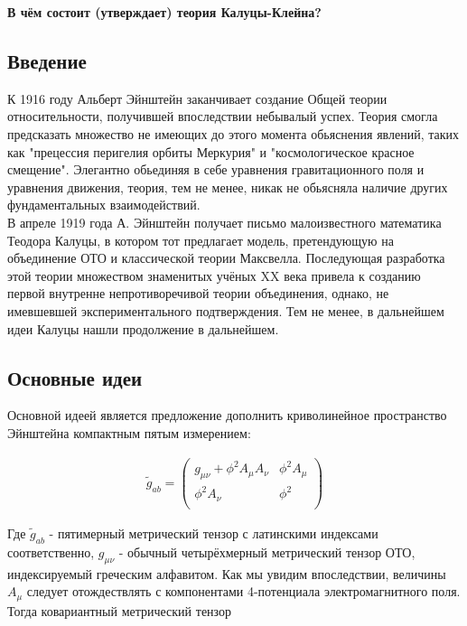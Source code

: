 \documentclass[a4paper,14pt]{article}
\begin{document}
\begin{center}
	\LARGE{\textbf{В чём состоит (утверждает) теория Калуцы-Клейна?}}\\
\end{center}

\subsection*{ Введение }

	К 1916 году Альберт Эйнштейн заканчивает создание Общей теории относительности, получившей впоследствии небывалый успех. Теория смогла предсказать множество не имеющих до этого момента обьяснения явлений, таких как "прецессия перигелия орбиты Меркурия" и "космологическое красное смещение". Элегантно обьединяя в себе уравнения гравитационного поля и уравнения движения, теория, тем не менее, никак не обьясняла наличие других фундаментальных взаимодействий. \\
	В апреле 1919 года А. Эйнштейн получает письмо малоизвестного математика Теодора Калуцы, в котором тот предлагает модель, претендующую на объединение ОТО и классической теории Максвелла. Последующая разработка этой теории множеством знаменитых учёных XX века привела к созданию первой внутренне непротиворечивой теории объединения, однако, не имевшевшей экспериментального подтверждения. Тем не менее, в дальнейшем идеи Калуцы нашли продолжение в дальнейшем.

\subsection*{ Основные идеи }

	 Основной идеей является предложение дополнить криволинейное пространство Эйнштейна компактным пятым измерением:

	\begin{align*}
	 	\tilde g_{ab} =
		\left( \begin{array}{cc}
			g_{ \mu \nu } + \phi^2 A_{\mu} A_{\nu} & \phi^2 A_{\mu}    \\
			\phi^2 A_{ \nu }                       & \phi^2            \\
		\end{array} \right)
	\end{align*}

	Где $ \tilde g_{ab} $ - пятимерный метрический тензор с латинскими индексами соответственно, $g_{ \mu \nu }$ - обычный четырёхмерный метрический тензор ОТО, индексируемый греческим алфавитом. Как мы увидим впоследствии, величины $A_{\mu}$ следует отождествлять с компонентами 4-потенциала электромагнитного поля.
	Тогда ковариантный метрический тензор
\end{document}
